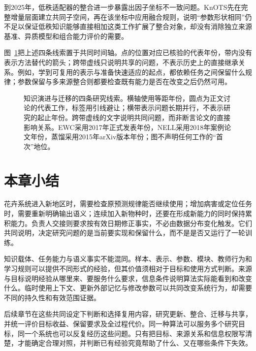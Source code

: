 到2025年，低秩适配器的整合进一步暴露出因子坐标不一致问题。KnOTS先在完整增量层面建立共同子空间，再在该坐标中应用融合规则，说明“参数形状相同”仍不足以保证低秩知识能够直接相加这类工作扩展了整合对象，却没有消除独立来源基准、异质模型和组合能力评价的需要。

图~\ref{fig:ket-overview-history}把上述四条线索置于共同时间轴。点的位置对应已核验的代表年份，带内没有表示方法替代的箭头；跨带虚线只说明共享的问题，不表示历史上的直接继承关系。例如，学到可复用的表示与准备快速适应的起点，都依赖任务之间保留什么规律；参数保留与多来源整合则都要检查既有能力是否在改变之后仍然可用。

\begin{figure}[htbp]
  \centering
  
  \caption{知识演进与迁移的四条研究线索。横轴使用等距年份，圆点为正文讨论的代表工作，标签用引线避让；横带表示问题长期并行，不表示研究的起止年份。跨带虚线的文字说明共同问题，而非断言论文的直接影响关系。EWC采用2017年正式发表年份，NELL采用2018年案例论文年份，蒸馏采用2015年arXiv版本年份；图不声明任何工作的“首次”地位。}
  \label{fig:ket-overview-history}
\end{figure}

\section{本章小结}
\label{sec:ket-overview-summary}

花卉系统进入新地区时，需要检查原预测规律能否继续使用；增加病害或定位任务时，需要重新明确输出语义；连续加入新物种时，还要在形成新能力的同时保持累积能力。负责人交接则要求按有效日期修正事实，不必由数据分布变化触发。它们共同说明，决定研究问题的是当前要实现和保留什么，而不是是否又运行了一轮训练。

知识载体、任务能力与语义事实不能混同。样本、表示、参数、模块、教师行为和学习规则可以提供不同形式的经验，但其价值须相对于目标和使用方式判断。来源与目标说明经验从哪里来、要服务什么要求，信息条件说明算法实际能看到和改变什么。临时使用上下文、更新外部记忆与修改参数可以共同改变系统行为，却需要不同的持久性和有效范围证据。

后续章节在这些共同设定下判断和选择复用内容，研究更新、整合、迁移与共享，并统一评价目标收益、保留要求及全过程代价。同一种算法可以服务多个研究目标，同一个系统也可以反复经历这些问题。只有把目标、来源关系和信息权限写清楚，才能确定合理对照，并判断已有经验究竟帮助了什么、又在哪些条件下失效。
